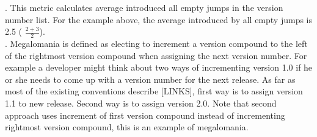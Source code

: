 \documentclass[conference]{IEEEtran}
\begin{document}
 
. 
This metric calculates average \numberchoices introduced all empty jumps in the version number list. For the example above, the average \numberchoices introduced by all empty jumps is 2.5 ( $\frac{ 2 + 3}{2}$).
 \\




%
%


%

 
. Megalomania is defined as electing to increment a version compound to the left of the rightmost version compound when assigning the next version number.
For example a developer might think about two ways of incrementing version 1.0 if he or she needs to come up with a version number for the next release.
 As far as most of the existing conventions describe [LINKS], first way is to assign version 1.1 to new release. Second way is to assign version 2.0. Note that second approach uses increment of first version compound instead of incrementing rightmost version compound, this is an example of megalomania. 
\end{document}
